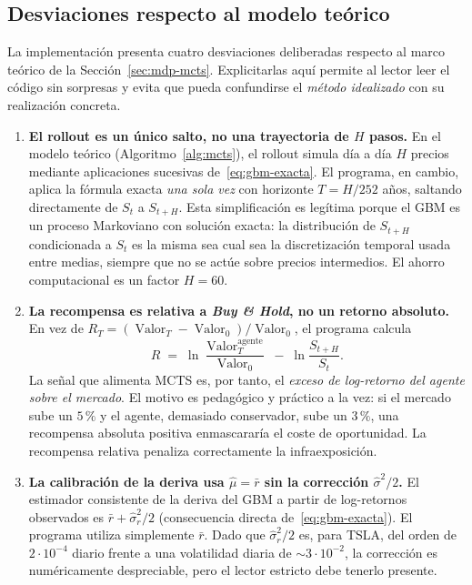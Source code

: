 \subsection{Desviaciones respecto al modelo teórico}
\label{subsec:desviaciones}

La implementación presenta cuatro desviaciones deliberadas respecto al marco teórico de la Sección~\ref{sec:mdp-mcts}. Explicitarlas aquí permite al lector leer el código sin sorpresas y evita que pueda confundirse el \emph{método idealizado} con su realización concreta.

\begin{enumerate}
    \item[\textbf{(D1)}] \textbf{El rollout es un único salto, no una trayectoria de $H$ pasos.} En el modelo teórico (Algoritmo~\ref{alg:mcts}), el rollout simula día a día $H$ precios mediante aplicaciones sucesivas de~\eqref{eq:gbm-exacta}. El programa, en cambio, aplica la fórmula exacta \emph{una sola vez} con horizonte $T = H/252$ años, saltando directamente de $S_t$ a $S_{t+H}$. Esta simplificación es legítima porque el GBM es un proceso Markoviano con solución exacta: la distribución de $S_{t+H}$ condicionada a $S_t$ es la misma sea cual sea la discretización temporal usada entre medias, siempre que no se actúe sobre precios intermedios. El ahorro computacional es un factor $H = 60$.
    \item[\textbf{(D2)}] \textbf{La recompensa es relativa a \emph{Buy \& Hold}, no un retorno absoluto.} En vez de $R_T = (\operatorname{Valor}_T - \operatorname{Valor}_0)/\operatorname{Valor}_0$, el programa calcula
    \[
        R \;=\; \ln\!\frac{\operatorname{Valor}_T^{\text{agente}}}{\operatorname{Valor}_0} \;-\; \ln\!\frac{S_{t+H}}{S_t}.
    \]
    La señal que alimenta MCTS es, por tanto, el \emph{exceso de log-retorno del agente sobre el mercado}. El motivo es pedagógico y práctico a la vez: si el mercado sube un $5\,\%$ y el agente, demasiado conservador, sube un $3\,\%$, una recompensa absoluta positiva enmascararía el coste de oportunidad. La recompensa relativa penaliza correctamente la infraexposición.
    \item[\textbf{(D3)}] \textbf{La calibración de la deriva usa $\hat\mu = \bar r$ sin la corrección $\hat\sigma^2/2$.} El estimador consistente de la deriva del GBM a partir de log-retornos observados es $\bar r + \hat\sigma_r^2/2$ (consecuencia directa de~\eqref{eq:gbm-exacta}). El programa utiliza simplemente $\bar r$. Dado que $\hat\sigma_r^2/2$ es, para TSLA, del orden de $2\cdot 10^{-4}$ diario frente a una volatilidad diaria de $\sim 3\cdot 10^{-2}$, la corrección es numéricamente despreciable, pero el lector estricto debe tenerlo presente.

\end{enumerate}
